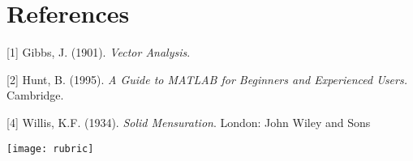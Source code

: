
\section{References} %
[1] Gibbs, J. (1901). \textit{Vector Analysis}.

[2] Hunt, B. (1995). \textit{A Guide to MATLAB for Beginners and Experienced Users.} Cambridge.


[4] Willis, K.F. (1934). \textit{Solid Mensuration}. London: John Wiley and Sons

\newpage
\begin{figure*}[!t]
	\texttt{[image: rubric]} 
\end{figure*}
\cleardoublepage

